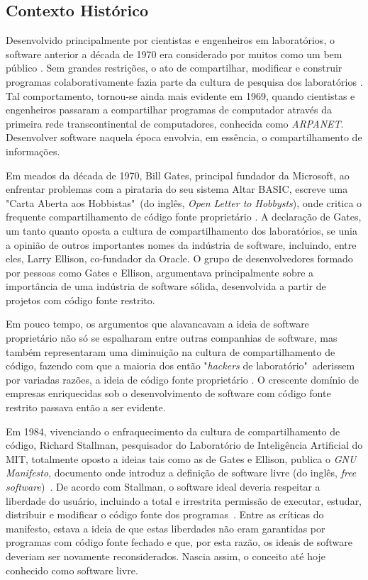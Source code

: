 \subsection{Contexto Histórico}
Desenvolvido principalmente por cientistas e engenheiros em laboratórios, o software anterior a década de 1970 era considerado por muitos como um bem público  \citep{levy1984hackers}. Sem grandes restrições, o ato de compartilhar, modificar e construir programas colaborativamente fazia parte da cultura de pesquisa dos laboratórios \citep{von2003open}. Tal comportamento, tornou-se ainda mais evidente em 1969, quando cientistas e engenheiros passaram a compartilhar programas de computador através da primeira rede transcontinental de computadores, conhecida como \textit{ARPANET}. Desenvolver software naquela época envolvia, em essência, o compartilhamento de informações.

Em meados da década de 1970,  Bill Gates, principal fundador da Microsoft, ao enfrentar problemas com a pirataria do seu sistema Altar BASIC, escreve uma "Carta Aberta aos Hobbistas"~(do inglês, \textit{Open Letter to Hobbysts}), onde critica o frequente compartilhamento de código fonte proprietário \citep{KAVANAGH20041}. A declaração de Gates, um tanto quanto oposta a cultura de compartilhamento dos laboratórios, se unia a opinião de outros importantes nomes da indústria de software, incluindo, entre eles, Larry Ellison, co-fundador da Oracle.  O grupo de desenvolvedores formado por pessoas como Gates e Ellison, argumentava principalmente sobre a importância de uma indústria de software sólida, desenvolvida a partir de projetos com código fonte restrito. 

Em pouco tempo, os argumentos que alavancavam a ideia de software proprietário não só se espalharam entre outras companhias de software, mas também representaram uma diminuição na cultura de compartilhamento de código, fazendo com que a maioria dos então "\textit{hackers} de laboratório"~aderissem por variadas razões, a ideia de código fonte proprietário \citep{4686552}. O crescente domínio de empresas enriquecidas sob o desenvolvimento de software com código fonte restrito passava então a ser evidente.

Em 1984, vivenciando o enfraquecimento da cultura de compartilhamento de código, Richard Stallman, pesquisador do Laboratório de Inteligência Artificial do MIT, totalmente oposto a ideias tais como as de Gates e Ellison, publica o \textit{GNU Manifesto}, documento onde introduz a definição de software livre (do inglês, \textit{free software})~\citep{stallman1985gnu}. De acordo com Stallman, o software ideal deveria respeitar a liberdade do usuário, incluindo a total e irrestrita permissão de executar, estudar, distribuir e modificar o código fonte dos programas~\citep{stallman2002free}. Entre as críticas do manifesto, estava a ideia de que estas liberdades não eram garantidas por programas com código fonte fechado e que, por esta razão, os ideais de software deveriam ser novamente reconsiderados. Nascia assim, o conceito até hoje conhecido como software livre.

